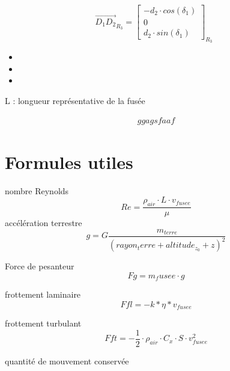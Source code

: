 \documentclass[12pt,a4paper]{article}
\begin{document}
\begin{equation}
\vec{D_1 D_2}_{R_3}=
\begin{bmatrix}
-d_2 \cdot cos(\delta_1)\\
0\\
d_2 \cdot sin(\delta_1)
\end{bmatrix}_{R_3} \enspace
\end{equation}

\begin{itemize}
	\item
	\item 
	\item 
\end{itemize}


\medbreak

\medbreak

\medbreak

\medbreak
L : longueur représentative de la fusée


\begin{eqnarray}
ggagsfaaf
\end{eqnarray}

\section{Formules utiles}
nombre Reynolds
\begin{equation}
Re=\frac{\rho_{air} \cdot L \cdot v_{fusee}}{\mu}
\end{equation}
accélération terrestre
\begin{equation}
g= G \frac{m_{terre}}{(rayon_terre+altitude_{z_0}+z)^2}
\end{equation}

Force de pesanteur
\begin{equation}
Fg=m_fusee \cdot g
\end{equation}

frottement laminaire
\begin{equation}
Ffl=-k*\eta*v_{fusee}
\end{equation}

frottement turbulant
\begin{equation}
Fft=-\frac{1}{2} \cdot \rho_{air} \cdot C_x \cdot S \cdot v_{fusee}^2
\end{equation}

quantité de mouvement conservée
\end{document}
